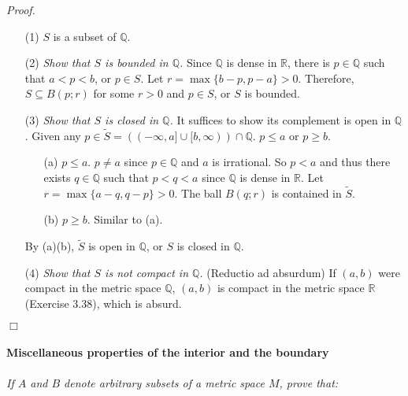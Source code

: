 \documentclass{article}
\begin{document}
\emph{Proof.}
\begin{enumerate}
\item[(1)]
$S$ is a subset of $\mathbb{Q}$.
\item[(2)]
\emph{Show that $S$ is bounded in $\mathbb{Q}$.}
Since $\mathbb{Q}$ is dense in $\mathbb{R}$,
there is $p \in \mathbb{Q}$ such that $a < p < b$, or $p \in S$.
Let $r = \max\{b - p, p - a\} > 0$.
Therefore, $S \subseteq B(p; r)$ for some $r > 0$ and $p \in S$,
or $S$ is bounded.
\item[(3)]
\emph{Show that $S$ is closed in $\mathbb{Q}$.}
It suffices to show its complement is open in $\mathbb{Q}$.
Given any
$p \in \widetilde{S} = ((-\infty, a] \cup [b, \infty)) \cap \mathbb{Q}$.
$p \leq a$ or $p \geq b$.
  \begin{enumerate}
  \item[(a)]
  $p \leq a$. $p \neq a$ since $p \in \mathbb{Q}$ and $a$ is irrational.
  So $p < a$ and thus there exists $q \in \mathbb{Q}$ such that $p < q < a$
  since $\mathbb{Q}$ is dense in $\mathbb{R}$.
  Let $r = \max\{a - q, q - p\} > 0$.
  The ball $B(q; r)$ is contained in $\widetilde{S}$.
  \item[(b)]
  $p \geq b$. Similar to (a).
  \end{enumerate}
  By (a)(b), $\widetilde{S}$ is open in $\mathbb{Q}$, or $S$ is closed in $\mathbb{Q}$.
\item[(4)]
\emph{Show that $S$ is not compact in $\mathbb{Q}$.}
(Reductio ad absurdum)
If $(a,b)$ were compact in the metric space $\mathbb{Q}$,
$(a,b)$ is compact in the metric space $\mathbb{R}$ (Exercise 3.38),
which is absurd.
\end{enumerate}
$\Box$ \\\\







\textbf{\large Miscellaneous properties of the interior and the boundary} \\\\

\emph{If $A$ and $B$ denote arbitrary subsets of a metric space $M$, prove that:} \\\\
\end{document}
